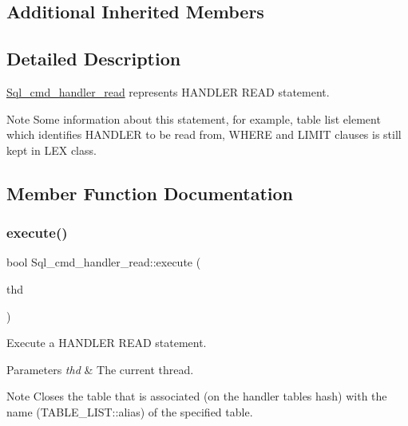 \subsection*{Additional Inherited Members}


\subsection{Detailed Description}
\mbox{\hyperlink{classSql__cmd__handler__read}{Sql\+\_\+cmd\+\_\+handler\+\_\+read}} represents H\+A\+N\+D\+L\+ER R\+E\+AD statement.

\begin{DoxyNote}{Note}
Some information about this statement, for example, table list element which identifies H\+A\+N\+D\+L\+ER to be read from, W\+H\+E\+RE and L\+I\+M\+IT clauses is still kept in L\+EX class. 
\end{DoxyNote}


\subsection{Member Function Documentation}
\mbox{\label{classSql__cmd__handler__read_ab22e7bb754b8f8a9b6d64af65329ca2c}} 
\subsubsection{\texorpdfstring{execute()}{execute()}}
{\footnotesize\ttfamily bool Sql\+\_\+cmd\+\_\+handler\+\_\+read\+::execute (\begin{DoxyParamCaption}\item[{T\+HD $\ast$}]{thd }\end{DoxyParamCaption})\hspace{0.3cm}{\ttfamily [virtual]}}

Execute a H\+A\+N\+D\+L\+ER R\+E\+AD statement.


\begin{DoxyParams}{Parameters}
{\em thd} & The current thread.\\
\hline
\end{DoxyParams}
\begin{DoxyNote}{Note}
Closes the table that is associated (on the handler tables hash) with the name (T\+A\+B\+L\+E\+\_\+\+L\+I\+S\+T\+::alias) of the specified table.
\end{DoxyNote}

